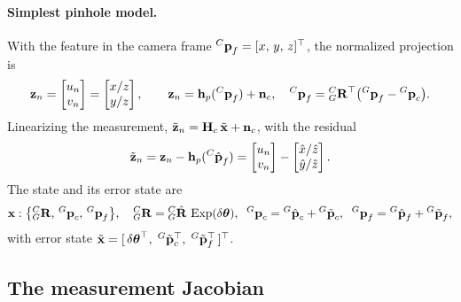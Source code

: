 \paragraph{Simplest pinhole model.} With the feature in the camera frame ${}^{C}\boldsymbol{\mathbf{p}}_f = [x,\,y,\,z]^\top$, the normalized projection is
\begin{align}
\boldsymbol{\mathbf{z}}_n = \begin{bmatrix} u_n \\ v_n \end{bmatrix} = \begin{bmatrix} x/z \\ y/z \end{bmatrix},
\qquad
\boldsymbol{\mathbf{z}}_n = \boldsymbol{\mathbf{h}}_p({}^{C}\boldsymbol{\mathbf{p}}_f) + \boldsymbol{\mathbf{n}}_c, \quad {}^{C}\boldsymbol{\mathbf{p}}_f = {}^{C}_{G}\boldsymbol{\mathbf{R}}^\top\big({}^{G}\boldsymbol{\mathbf{p}}_f - {}^{G}\boldsymbol{\mathbf{p}}_c\big).
\end{align}
Linearizing the measurement, $\tilde{\boldsymbol{\mathbf{z}}}_n = \boldsymbol{\mathbf{H}}_c\,\tilde{\boldsymbol{\mathbf{x}}} + \boldsymbol{\mathbf{n}}_c$, with the residual
\begin{align}
\tilde{\boldsymbol{\mathbf{z}}}_n = \boldsymbol{\mathbf{z}}_n - \boldsymbol{\mathbf{h}}_p({}^{C}\hat{\boldsymbol{\mathbf{p}}}_f) = \begin{bmatrix} u_n \\ v_n \end{bmatrix} - \begin{bmatrix} \hat{x}/\hat{z} \\ \hat{y}/\hat{z} \end{bmatrix}.
\end{align}
The state and its error state are
\begin{align}
\boldsymbol{\mathbf{x}} : \big\{{}^{C}_{G}\boldsymbol{\mathbf{R}},\,{}^{G}\boldsymbol{\mathbf{p}}_c,\,{}^{G}\boldsymbol{\mathbf{p}}_f\big\}, \quad
{}^{C}_{G}\boldsymbol{\mathbf{R}} = {}^{C}_{G}\hat{\boldsymbol{\mathbf{R}}}\,\operatorname{Exp}(\delta\boldsymbol{\mathbf{\theta}}), \;\;
{}^{G}\boldsymbol{\mathbf{p}}_c = {}^{G}\hat{\boldsymbol{\mathbf{p}}}_c + {}^{G}\tilde{\boldsymbol{\mathbf{p}}}_c, \;\;
{}^{G}\boldsymbol{\mathbf{p}}_f = {}^{G}\hat{\boldsymbol{\mathbf{p}}}_f + {}^{G}\tilde{\boldsymbol{\mathbf{p}}}_f,
\end{align}
with error state $\tilde{\boldsymbol{\mathbf{x}}} = [\,\delta\boldsymbol{\mathbf{\theta}}^\top,\; {}^{G}\tilde{\boldsymbol{\mathbf{p}}}_c^\top,\; {}^{G}\tilde{\boldsymbol{\mathbf{p}}}_f^\top\,]^\top$.

\subsection{The measurement Jacobian}

